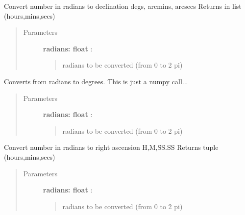 \documentclass[letterpaper,10pt,english]{sphinxmanual}
\begin{document}

\begin{fulllineitems}
\label{index:astroCoords.rad2decdms}
Convert number in radians to declination degs, arcmins, arcsecs
Returns in list (hours,mins,secs)
\begin{quote}\begin{description}
\item[{Parameters }] \leavevmode
\textbf{radians: float} :
\begin{quote}

radians to be converted (from 0 to 2 pi)
\end{quote}

\end{description}\end{quote}

\end{fulllineitems}



\begin{fulllineitems}
\label{index:astroCoords.rad2deg}
Converts from radians to degrees.
This is just a numpy call...
\begin{quote}\begin{description}
\item[{Parameters }] \leavevmode
\textbf{radians: float} :
\begin{quote}

radians to be converted (from 0 to 2 pi)
\end{quote}

\end{description}\end{quote}

\end{fulllineitems}



\begin{fulllineitems}
\label{index:astroCoords.rad2rahms}
Convert number in radians to right ascension H,M,SS.SS
Returns tuple (hours,mins,secs)
\begin{quote}\begin{description}
\item[{Parameters }] \leavevmode
\textbf{radians: float} :
\begin{quote}

radians to be converted (from 0 to 2 pi)
\end{quote}

\end{description}\end{quote}

\end{fulllineitems}
\end{document}
